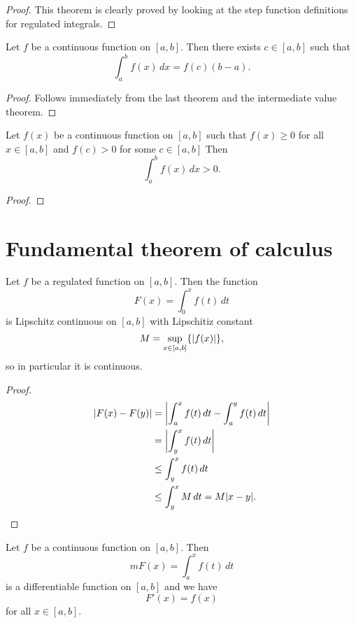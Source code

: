\begin{proof}
    This theorem is clearly proved by looking at the step function definitions for regulated integrals. 
\end{proof}

\begin{theorem}
    Let $f$ be a continuous function on $[a, b]$. Then there exists $c \in [a, b]$ such that \[ \int_a^b f(x) \, dx = f(c) (b - a). \]
\end{theorem}

\begin{proof}
    Follows immediately from the last theorem and the intermediate value theorem.
\end{proof}

\begin{proposition}
    Let $f(x)$ be a continuous function on $[a, b]$ such that $f(x) \geq 0$ for all $x \in [a, b]$ and $f(c) > 0$ for some $c \in [a, b]$ Then \[ \int_a^b f(x) \, dx > 0. \]
\end{proposition}

\begin{proof}
\end{proof}

\section{Fundamental theorem of calculus}

\begin{theorem}
    Let $f$ be a regulated function on $[a, b]$. Then the function \[ F(x) = \int_0^x f(t) \, dt \] is Lipschitz continuous on $[a, b]$ with Lipschitiz constant \[ M = \sup_{x \in [a, b]} \{ \lvert f(x)\rvert \}, \] so in particular it is continuous.
\end{theorem}

\begin{proof}
    \begin{align*}
        \lvert F(x) - F(y)\rvert &= \left\lvert \int_a^x f(t) \, dt - \int_a^y f(t) \, dt \right\rvert \\
        &= \left\lvert \int_y^x f(t) \, dt \right\rvert \\
        &\leq \int_y^x f(t) \, dt \\
        &\leq \int_y^x M \, dt = M \lvert x - y\rvert.
    \end{align*}
\end{proof}

\begin{theorem}
    Let $f$ be a continuous function on $[a, b]$. Then \[ mF(x) = \int_a^x f(t) \, dt \] is a differentiable function on $[a, b]$ and we have \[ F'(x) = f(x) \] for all $x \in [a, b]$.
\end{theorem}

